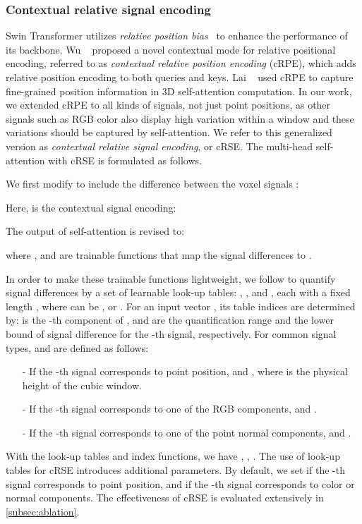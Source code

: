 \documentclass[10pt,twocolumn,letterpaper]{article}
\begin{document}
\subsubsection{Contextual relative signal encoding}

Swin Transformer utilizes \emph{relative position bias}~\cite{shaw2018self} to enhance the performance of its backbone. Wu \etal~\cite{wu2021rethinking} proposed a novel contextual mode for relative positional encoding, referred to as \emph{contextual relative position encoding} (cRPE), which adds relative position encoding to both queries and keys. Lai \etal~\cite{lai2022stratified} used cRPE to capture fine-grained position information in 3D self-attention computation. In our work, we extended cRPE to all kinds of signals, not just point positions, as other signals such as RGB color also display high variation within a window and these variations should be captured by self-attention. We refer to this generalized version as \emph{contextual relative signal encoding}, or cRSE. The multi-head self-attention with cRSE is formulated as follows.

We first modify  to include the difference between the voxel signals :

Here,  is the contextual signal encoding:


The output of self-attention is revised to:

where ,  and  are trainable functions that map the signal differences to .

In order to make these trainable functions lightweight, we follow \cite{shaw2018self, lai2022stratified} to quantify signal differences by a set of learnable look-up tables: , , and , each with a fixed length , where  can be ,  or . For an input vector , its table indices are determined by:   is the -th component of ,  and  are the quantification range and the lower bound of signal difference for the -th signal, respectively. For common signal types,  and  are defined as follows:
\begin{enumerate}[leftmargin=*]\item[-]  If the -th signal corresponds to point position,  and , where  is the physical height of the cubic window.
\item[-] If the -th signal corresponds to one of the RGB components,  and .
\item[-] If the -th signal corresponds to one of the point normal components,  and .
\end{enumerate}
With the look-up tables and index functions, we have , , . The use of look-up tables for cRSE introduces additional  parameters. By default, we set  if the -th signal corresponds to point position, and  if the -th signal corresponds to color or normal components. The effectiveness of cRSE is evaluated extensively in \cref{subsec:ablation}.
\end{document}
